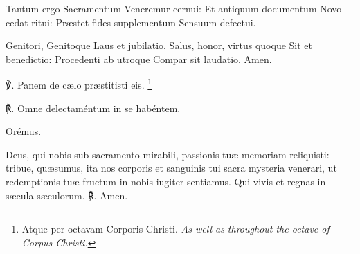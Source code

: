 Tantum ergo Sacramentum
Veneremur cernui:
Et antiquum documentum
Novo cedat ritui:
Præstet fides supplementum
Sensuum defectui.

Genitori, Genitoque
Laus et jubilatio,
Salus, honor, virtus quoque
Sit et benedictio:
Procedenti ab utroque
Compar sit laudatio. Amen.

℣. Panem de cælo præstitisti eis. \tpalleluia{}\footnote{Atque per octavam Corporis Christi. \textit{As well as throughout the octave of Corpus Christi.}}

℟. Omne dele\-ctaméntum in se habéntem. \tpalleluia{}
\par
Orémus.

Deus, qui nobis sub sacramento mirabili, passionis tuæ memoriam reliquisti: tribue, quæsumus, ita nos corporis et sanguinis tui sacra mysteria venerari, ut redemptionis tuæ fructum in nobis iugiter sentiamus. Qui vivis et regnas in sæcula sæculorum. ℟. Amen. 